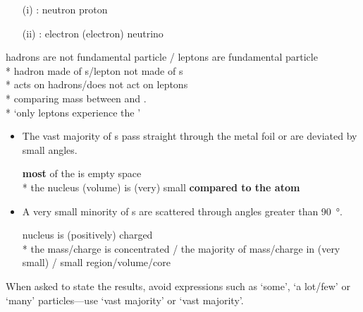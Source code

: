 \begin{question}%

  \begin{itemize}
    \item [(i)] : neutron \OR proton
    \item [(ii)] : electron \OR (electron) neutrino
  \end{itemize}
\end{question}

\begin{question}%

  hadrons are not fundamental particle / leptons are fundamental particle \\*
  \OR hadron made of s/lepton not made of s \\*
  \OR {} acts on hadrons/does not act on leptons~\hfill{}\\*
  \NOT comparing mass between  and . \\*
  \NOT `only leptons experience the '
\end{question}

\begin{question}%

  \begin{itemize}
    \item The vast majority of s pass straight through the metal foil or are deviated by small angles.

    \textbf{most} of the  is empty space \\*
    \OR the nucleus (volume) is (very) small \textbf{compared to the atom}~\hfill{}

    \item A very small minority of s are scattered through angles greater than \SI{90}{\degree}.

    nucleus is (positively) charged~\hfill{}\\*
    the mass/charge is concentrated / the majority of mass/charge in (very small)  / small region/volume/core~\hfill{}

  \end{itemize}

  When asked to state the results, avoid expressions such as `some', `a lot/few' or `many' particles---use `vast majority' or `vast majority'.
\end{question}


